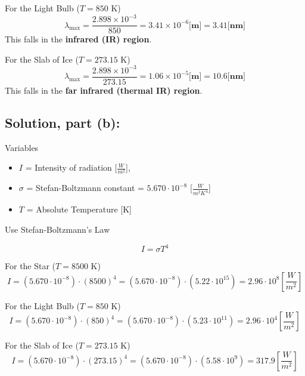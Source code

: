 \documentclass[12pt]{article}
\begin{document}
        For the Light Bulb ($T = 850$ K)
        \begin{equation}
            \lambda_{\text{max}} = \frac{2.898 \times 10^{-3}}{850} = 3.41 \times 10^{-6} \textbf{[m]} = 3.41 \textbf{[nm]}
        \end{equation}
        This falls in the \textbf{infrared (IR) region}.

        For the Slab of Ice ($T = 273.15$ K)
        \begin{equation}
            \lambda_{\text{max}} = \frac{2.898 \times 10^{-3}}{273.15} = 1.06 \times 10^{-5} \textbf{[m]} = 10.6 \textbf{[nm]}
        \end{equation}
        This falls in the \textbf{far infrared (thermal IR) region}.

    \subsection{Solution, part (b):}
        Variables
        \begin{itemize}
            \item $I$ = Intensity of radiation [$\frac{W}{m^2}$],
            \item $\sigma$ = Stefan-Boltzmann constant = $5.670 \cdot 10^{-8}$ [$\frac{W}{m^2 K^4}$]
            \item $T$ = Absolute Temperature [K]
        \end{itemize}

        Use Stefan-Boltzmann’s Law

        \begin{equation}
            I = \sigma T^4
        \end{equation}

        For the Star ($T = 8500$ K)
        \begin{equation}
            I = (5.670 \cdot 10^{-8}) \cdot (8500)^4 = (5.670 \cdot 10^{-8}) \cdot (5.22 \cdot 10^{15}) = 2.96 \cdot 10^{8} [\frac{W}{m^2}]
        \end{equation}

        For the Light Bulb ($T = 850$ K)
        \begin{equation}
        I = (5.670 \cdot 10^{-8}) \cdot (850)^4 = (5.670 \cdot 10^{-8}) \cdot (5.23 \cdot 10^{11}) = 2.96 \cdot 10^{4} [\frac{W}{m^2}]
        \end{equation}

        For the Slab of Ice ($T = 273.15$ K)
        \begin{equation}
        I = (5.670 \cdot 10^{-8}) \cdot (273.15)^4 = (5.670 \cdot 10^{-8}) \cdot (5.58 \cdot 10^{9}) = 317.9 [\frac{W}{m^2}]
        \end{equation}
\end{document}
